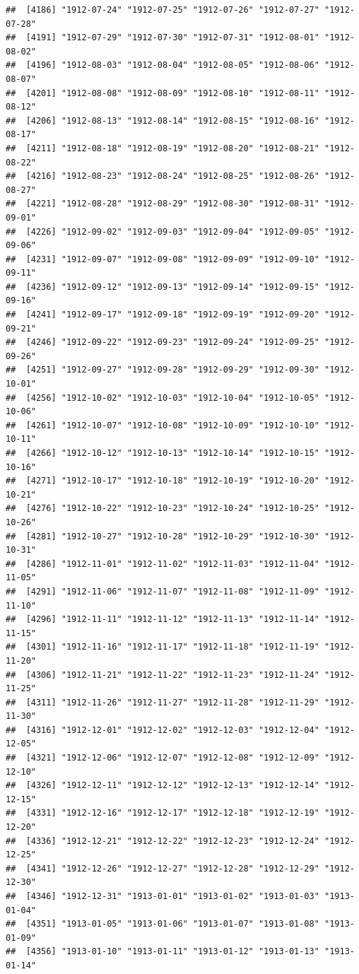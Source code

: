 \documentclass{article}\usepackage[]{graphicx}\usepackage[]{color}
\makeatletter
\newenvironment{kframe}{%
 \def\at@end@of@kframe{}%
 \ifinner\ifhmode%
  \def\at@end@of@kframe{\end{minipage}}%
  \begin{minipage}{\columnwidth}%
 \fi\fi%
 \def\FrameCommand##1{\hskip\@totalleftmargin \hskip-\fboxsep
 \colorbox{shadecolor}{##1}\hskip-\fboxsep
     \hskip-\linewidth \hskip-\@totalleftmargin \hskip\columnwidth}%
 \MakeFramed {\advance\hsize-\width
   \@totalleftmargin\z@ \linewidth\hsize
   \@setminipage}}%
 {\par\unskip\endMakeFramed%
 \at@end@of@kframe}
\newenvironment{knitrout}{}{} %
\makeatother
\begin{document}
\begin{description}
\begin{knitrout}
\begin{kframe}
\begin{verbatim}
##  [4186] "1912-07-24" "1912-07-25" "1912-07-26" "1912-07-27" "1912-07-28"
##  [4191] "1912-07-29" "1912-07-30" "1912-07-31" "1912-08-01" "1912-08-02"
##  [4196] "1912-08-03" "1912-08-04" "1912-08-05" "1912-08-06" "1912-08-07"
##  [4201] "1912-08-08" "1912-08-09" "1912-08-10" "1912-08-11" "1912-08-12"
##  [4206] "1912-08-13" "1912-08-14" "1912-08-15" "1912-08-16" "1912-08-17"
##  [4211] "1912-08-18" "1912-08-19" "1912-08-20" "1912-08-21" "1912-08-22"
##  [4216] "1912-08-23" "1912-08-24" "1912-08-25" "1912-08-26" "1912-08-27"
##  [4221] "1912-08-28" "1912-08-29" "1912-08-30" "1912-08-31" "1912-09-01"
##  [4226] "1912-09-02" "1912-09-03" "1912-09-04" "1912-09-05" "1912-09-06"
##  [4231] "1912-09-07" "1912-09-08" "1912-09-09" "1912-09-10" "1912-09-11"
##  [4236] "1912-09-12" "1912-09-13" "1912-09-14" "1912-09-15" "1912-09-16"
##  [4241] "1912-09-17" "1912-09-18" "1912-09-19" "1912-09-20" "1912-09-21"
##  [4246] "1912-09-22" "1912-09-23" "1912-09-24" "1912-09-25" "1912-09-26"
##  [4251] "1912-09-27" "1912-09-28" "1912-09-29" "1912-09-30" "1912-10-01"
##  [4256] "1912-10-02" "1912-10-03" "1912-10-04" "1912-10-05" "1912-10-06"
##  [4261] "1912-10-07" "1912-10-08" "1912-10-09" "1912-10-10" "1912-10-11"
##  [4266] "1912-10-12" "1912-10-13" "1912-10-14" "1912-10-15" "1912-10-16"
##  [4271] "1912-10-17" "1912-10-18" "1912-10-19" "1912-10-20" "1912-10-21"
##  [4276] "1912-10-22" "1912-10-23" "1912-10-24" "1912-10-25" "1912-10-26"
##  [4281] "1912-10-27" "1912-10-28" "1912-10-29" "1912-10-30" "1912-10-31"
##  [4286] "1912-11-01" "1912-11-02" "1912-11-03" "1912-11-04" "1912-11-05"
##  [4291] "1912-11-06" "1912-11-07" "1912-11-08" "1912-11-09" "1912-11-10"
##  [4296] "1912-11-11" "1912-11-12" "1912-11-13" "1912-11-14" "1912-11-15"
##  [4301] "1912-11-16" "1912-11-17" "1912-11-18" "1912-11-19" "1912-11-20"
##  [4306] "1912-11-21" "1912-11-22" "1912-11-23" "1912-11-24" "1912-11-25"
##  [4311] "1912-11-26" "1912-11-27" "1912-11-28" "1912-11-29" "1912-11-30"
##  [4316] "1912-12-01" "1912-12-02" "1912-12-03" "1912-12-04" "1912-12-05"
##  [4321] "1912-12-06" "1912-12-07" "1912-12-08" "1912-12-09" "1912-12-10"
##  [4326] "1912-12-11" "1912-12-12" "1912-12-13" "1912-12-14" "1912-12-15"
##  [4331] "1912-12-16" "1912-12-17" "1912-12-18" "1912-12-19" "1912-12-20"
##  [4336] "1912-12-21" "1912-12-22" "1912-12-23" "1912-12-24" "1912-12-25"
##  [4341] "1912-12-26" "1912-12-27" "1912-12-28" "1912-12-29" "1912-12-30"
##  [4346] "1912-12-31" "1913-01-01" "1913-01-02" "1913-01-03" "1913-01-04"
##  [4351] "1913-01-05" "1913-01-06" "1913-01-07" "1913-01-08" "1913-01-09"
##  [4356] "1913-01-10" "1913-01-11" "1913-01-12" "1913-01-13" "1913-01-14"

\end{verbatim}
\end{kframe}
\end{knitrout}
\end{description}
\end{document}
